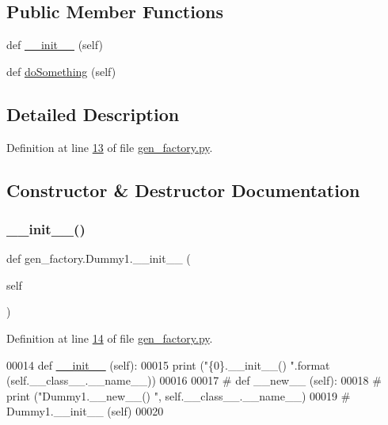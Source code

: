 \subsection*{Public Member Functions}
\begin{DoxyCompactItemize}
\item 
def \hyperlink{classgen__factory_1_1_dummy1_a9bb75256a466ee77a0ae2cafb339fe62}{\+\_\+\+\_\+init\+\_\+\+\_\+} (self)
\item 
def \hyperlink{classgen__factory_1_1_dummy1_af8a40601dbd998624323da24581dfa1c}{do\+Something} (self)
\end{DoxyCompactItemize}


\subsection{Detailed Description}


Definition at line \hyperlink{gen__factory_8py_source_l00013}{13} of file \hyperlink{gen__factory_8py_source}{gen\+\_\+factory.\+py}.



\subsection{Constructor \& Destructor Documentation}
\mbox{\label{classgen__factory_1_1_dummy1_a9bb75256a466ee77a0ae2cafb339fe62}} 
\subsubsection{\texorpdfstring{\+\_\+\+\_\+init\+\_\+\+\_\+()}{\_\_init\_\_()}}
{\footnotesize\ttfamily def gen\+\_\+factory.\+Dummy1.\+\_\+\+\_\+init\+\_\+\+\_\+ (\begin{DoxyParamCaption}\item[{}]{self }\end{DoxyParamCaption})}



Definition at line \hyperlink{gen__factory_8py_source_l00014}{14} of file \hyperlink{gen__factory_8py_source}{gen\+\_\+factory.\+py}.


\begin{DoxyCode}
00014     \textcolor{keyword}{def }\hyperlink{namespacestart__time_a9c9bd378729a13c96a22c8b079ea172c}{\_\_init\_\_} (self):
00015         \textcolor{keywordflow}{print} (\textcolor{stringliteral}{"\{0\}.\_\_init\_\_() "}.format (self.\_\_class\_\_.\_\_name\_\_))
00016         
00017 \textcolor{comment}{#    def \_\_new\_\_ (self):}
00018 \textcolor{comment}{#        print ("Dummy1.\_\_new\_\_() ", self.\_\_class\_\_.\_\_name\_\_)}
00019 \textcolor{comment}{#        Dummy1.\_\_init\_\_ (self)}
00020         
\end{DoxyCode}


